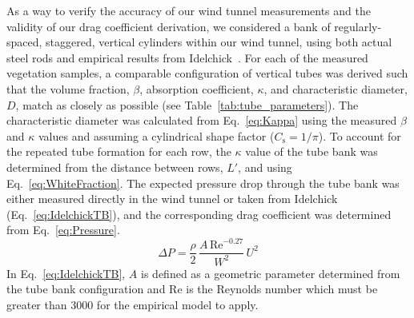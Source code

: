 \documentclass[12pt]{article}
\begin{document}
As a way to verify the accuracy of our wind tunnel measurements and the validity of our drag coefficient derivation, we considered a bank of regularly-spaced, staggered, vertical cylinders within our wind tunnel, using both actual steel rods and empirical results from Idelchick~\cite{Idelchick1994}. For each of the measured vegetation samples, a comparable configuration of vertical tubes was derived such that the volume fraction, $\beta$, absorption coefficient, $\kappa$, and characteristic diameter, $D$, match as closely as possible (see Table~\ref{tab:tube_parameters}). The characteristic diameter was calculated from Eq.~\ref{eq:Kappa} using the measured $\beta$ and $\kappa$ values and assuming a cylindrical shape factor ($C_{\mathrm{s}} = 1/\pi$). To account for the repeated tube formation for each row, the $\kappa$ value of the tube bank was determined from the distance between rows, $L'$, and using Eq.~\ref{eq:WhiteFraction}. The expected pressure drop through the tube bank was either measured directly in the wind tunnel or taken from Idelchick (Eq.~\ref{eq:IdelchickTB}), and the corresponding drag coefficient was determined from Eq.~\ref{eq:Pressure}.
\begin{equation}
\label{eq:IdelchickTB}
\Delta P = \frac{\rho}{2}\,\frac{A\, \mathrm{Re}^{-0.27}}{W^{2}}\, U^2
\end{equation}
In Eq.~\ref{eq:IdelchickTB}, $A$ is defined as a geometric parameter determined from the tube bank configuration and Re is the Reynolds number which must be greater than 3000 for the empirical model to apply. 
\end{document}
